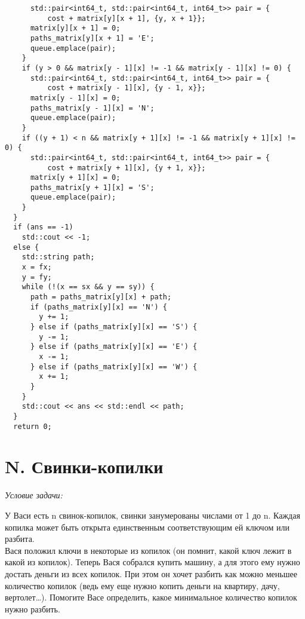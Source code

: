 \begin{center}
\begin{verbatim}
      std::pair<int64_t, std::pair<int64_t, int64_t>> pair = {
          cost + matrix[y][x + 1], {y, x + 1}};
      matrix[y][x + 1] = 0;
      paths_matrix[y][x + 1] = 'E';
      queue.emplace(pair);
    }
    if (y > 0 && matrix[y - 1][x] != -1 && matrix[y - 1][x] != 0) {
      std::pair<int64_t, std::pair<int64_t, int64_t>> pair = {
          cost + matrix[y - 1][x], {y - 1, x}};
      matrix[y - 1][x] = 0;
      paths_matrix[y - 1][x] = 'N';
      queue.emplace(pair);
    }
    if ((y + 1) < n && matrix[y + 1][x] != -1 && matrix[y + 1][x] != 0) {
      std::pair<int64_t, std::pair<int64_t, int64_t>> pair = {
          cost + matrix[y + 1][x], {y + 1, x}};
      matrix[y + 1][x] = 0;
      paths_matrix[y + 1][x] = 'S';
      queue.emplace(pair);
    }
  }
  if (ans == -1)
    std::cout << -1;
  else {
    std::string path;
    x = fx;
    y = fy;
    while (!(x == sx && y == sy)) {
      path = paths_matrix[y][x] + path;
      if (paths_matrix[y][x] == 'N') {
        y += 1;
      } else if (paths_matrix[y][x] == 'S') {
        y -= 1;
      } else if (paths_matrix[y][x] == 'E') {
        x -= 1;
      } else if (paths_matrix[y][x] == 'W') {
        x += 1;
      }
    }
    std::cout << ans << std::endl << path;
  }
  return 0;
    \end{verbatim}
\end{center}
\normalsize
\newpage


\section{N. Свинки-копилки}
\textit{Условие задачи:} \par
У Васи есть n свинок-копилок, свинки занумерованы числами от 1 до n. Каждая копилка может быть открыта единственным соответствующим ей ключом или разбита.\\
Вася положил ключи в некоторые из копилок (он помнит, какой ключ лежит в какой из копилок). Теперь Вася собрался купить машину, а для этого ему нужно
достать деньги из всех копилок. При этом он хочет разбить как можно меньшее количество копилок (ведь ему еще нужно копить деньги на квартиру, дачу, вертолет…).
Помогите Васе определить, какое минимальное количество копилок нужно разбить.\\

